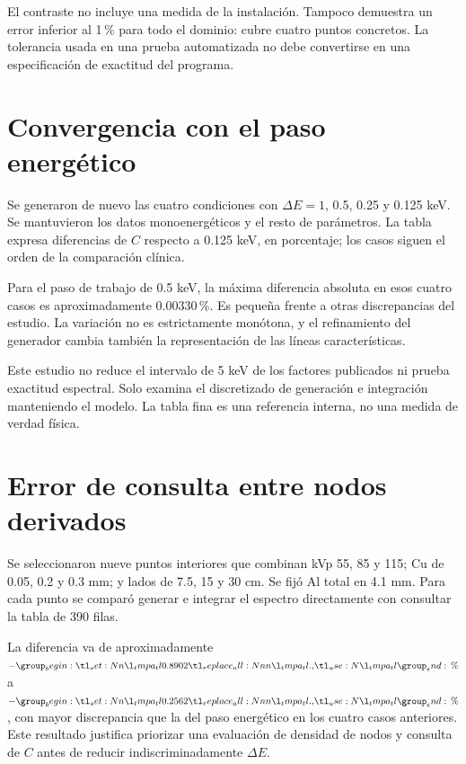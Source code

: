 El contraste no incluye una medida de la instalación. Tampoco demuestra un error inferior al 1\,\% para todo el dominio: cubre cuatro puntos concretos. La tolerancia usada en una prueba automatizada no debe convertirse en una especificación de exactitud del programa.

\section{Convergencia con el paso energético}
Se generaron de nuevo las cuatro condiciones con $\Delta E=1$, \num{0.5}, \num{0.25} y \num{0.125} keV. Se mantuvieron los datos monoenergéticos y el resto de parámetros. La tabla expresa diferencias de $C$ respecto a \num{0.125} keV, en porcentaje; los casos siguen el orden de la comparación clínica.
\begin{table}[htbp]\centering\small
\caption{Sensibilidad del factor combinado al paso energético. Referencia numérica: \num{0.125} keV.}

\end{table}
Para el paso de trabajo de \num{0.5} keV, la máxima diferencia absoluta en esos cuatro casos es aproximadamente \num{0.00330}\,\%. Es pequeña frente a otras discrepancias del estudio. La variación no es estrictamente monótona, y el refinamiento del generador cambia también la representación de las líneas características.

Este estudio no reduce el intervalo de 5 keV de los factores publicados ni prueba exactitud espectral. Solo examina el discretizado de generación e integración manteniendo el modelo. La tabla fina es una referencia interna, no una medida de verdad física.

\section{Error de consulta entre nodos derivados}
Se seleccionaron nueve puntos interiores que combinan kVp 55, 85 y 115; Cu de \num{0.05}, \num{0.2} y \num{0.3} mm; y lados de \num{7.5}, 15 y 30 cm. Se fijó Al total en \num{4.1} mm. Para cada punto se comparó generar e integrar el espectro directamente con consultar la tabla de 390 filas.
\begin{table}[htbp]\centering\small
\caption{Consulta interpolada frente a integración directa en nueve puntos interiores.}

\end{table}
La diferencia va de aproximadamente $-\num{0.8902}\,\text{\char37}$ a $-\num{0.2562}\,\text{\char37}$, con mayor discrepancia que la del paso energético en los cuatro casos anteriores. Este resultado justifica priorizar una evaluación de densidad de nodos y consulta de $C$ antes de reducir indiscriminadamente $\Delta E$.

